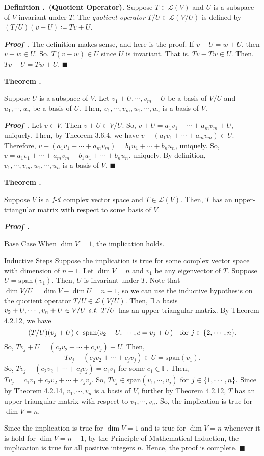 \documentclass[11pt, letterpaper]{article}
\newcounter{index}[subsection]
\newenvironment*{df}[1]{\par\noindent\textbf{Definition \thesubsection.\stepcounter{index}\theindex\ (#1).}}{\par}
\newenvironment*{thm}[1]{\begin{tcolorbox}\par\noindent\textbf{Theorem \thesubsection.\stepcounter{index}\theindex\ #1} \par}{\par\end{tcolorbox}}
\newcounter{nprf}[subsection]
\newenvironment*{prf}{\par\indent\textbf{\textit{Proof \stepcounter{nprf}\thenprf.}}}{\hfill$\blacksquare$\par}
\def\F{\mathbb{F}}
\def\L{\mathcal{L}}
\def\st{\emph{ s.t. }}
\def\FD{\emph{f-d}}
\def\span{\mathrm{span}}
\begin{document}
\begin{df}{Quotient Operator}
	Suppose $T\in\L(V)$ and $U$ is a subspace of $V$ invariant under $T$. The \textit{quotient operator} $T/U\in\L(V/U)$ is defined by $(T/U)(v+U)\coloneqq Tv+U$.
\end{df}
\begin{prf}
	The definition makes sense, and here is the proof. If $v+U=w+U$, then $v-w\in U$. So, $T(v-w)\in U$ since $U$ is invariant. That is, $Tv-Tw\in U$. Then, $Tv+U=Tw+U$.	
\end{prf}
\begin{thm}{}
	Suppose $U$ is a subspace of $V$. Let $v_1+U,\cdots,v_m+U$ be a basis of $V/U$ and $u_1,\cdots,u_n$ be a basis of $U$. Then, $v_1,\cdots,v_m,u_1,\cdots,u_n$ is a basis of $V$. 	
\end{thm}
\begin{prf}
	Let $v\in V$. Then $v+U\in V/U$. So, $v+U=a_1v_1+\cdots+a_mv_m+U$, uniquely. Then, by Theorem 3.6.4, we have $v-(a_1v_1+\cdots+a_mv_m)\in U$. Therefore, $v-(a_1v_1+\cdots+a_mv_m)=b_1u_1+\cdots+b_nu_n$, uniquely. So, $v=a_1v_1+\cdots+a_mv_m+b_1u_1+\cdots+b_nu_n$. uniquely. By definition, $v_1,\cdots,v_m,u_1,\cdots,u_n$ is a basis of $V$.
\end{prf}
\begin{thm}{}
	Suppose $V$ is a $\FD$ complex vector space and $T\in\L(V)$. Then, $T$ has an upper-triangular matrix with respect to some basis of $V$. 	
\end{thm}
\begin{prf}
	\par $\boxed{\text{Base Case}}$	When $\dim V=1$, the implication holds. 
	\par $\boxed{\text{Inductive Steps}}$ Suppose the implication is true for some complex vector space with dimension of $n-1$.  Let $\dim V=n$ and $v_1$ be any eigenvector of $T$. Suppose $U=\span(v_1).$ Then, $U$ is invariant under $T$. Note that $\dim V/U=\dim V-\dim U=n-1$, so we can use the inductive hypothesis on the quotient operator $T/U\in\L(V/U)$. Then, $\exists$ a basis $v_2+U,\cdots,v_n+U\in V/U\st T/U$ has an upper-triangular matrix. By Theorem 4.2.12, we have \[(T/U)(v_j+U)\in\span(v_2+U,\cdots,c=v_j+U)\quad\text{for }j\in\qty{2,\cdots,n}.\] So, $Tv_j+U=(c_2v_2+\cdots+c_jv_j)+U$. Then, \[Tv_j-(c_2v_2+\cdots+c_jv_j)\in U=\span(v_1).\] So, $Tv_j-(c_2v_2+\cdots+c_jv_j)=c_1v_1$ for some $c_1\in\F$. Then, $Tv_j=c_1v_1+c_2v_2+\cdots+c_jv_j$. So, $Tv_j\in\span(v_1,\cdots,v_j)$ for $j\in\qty{1,\cdots,n}$. Since by Theorem 4.2.14, $v_1,\cdots,v_n$ is a basis of $V$, further by Theorem 4.2.12, $T$ has an upper-triangular matrix with respect to $v_1,\cdots,v_n$. So, the implication is true for $\dim V=n$.
	\par Since the implication is true for $\dim V=1$ and is true for $\dim V=n$ whenever it is hold for $\dim V=n-1$, by the Principle of Mathematical Induction, the implication is true for all positive integers $n$. Hence, the proof is complete. 
\end{prf}
\end{document}
